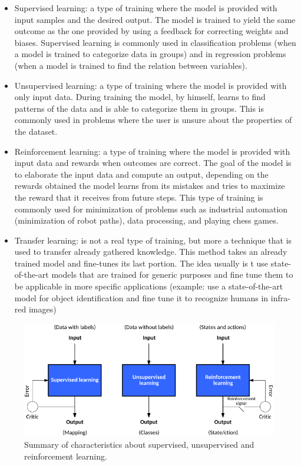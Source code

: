 \documentclass[12pt]{report}
\begin{document}
\begin{itemize}
\item Supervised learning: a type of training where the model is provided with input samples and the desired output. The model is trained to yield the same outcome as the one provided by using a feedback for correcting weights and biases. Supervised learning is commonly used in classification problems (when a model is trained to categorize data in groups) and in regression problems (when a model is trained to find the relation between variables).
\item Unsupervised learning: a type of training where the model is provided with only input data. During training the model, by himself, learns to find patterns of the data and is able to categorize them in groups. This is commonly used in problems where the user is unsure about the properties of the dataset.
\item Reinforcement learning: a type of training where the model is provided with input data and rewards when outcomes are correct. The goal of the model is to elaborate the input data and compute an output, depending on the rewards obtained the model learns from its mistakes and tries to maximize the reward that it receives from future steps. This type of training is commonly used for minimization of problems such as industrial automation (minimization of robot paths), data processing, and playing chess games.
\item Transfer learning: is not a real type of training, but more a technique that is used to transfer already gathered knowledge. This method takes an already trained model and fine-tunes its last portion. The idea usually is t use state-of-the-art models that are trained for generic purposes and fine tune them to be applicable in more specific applications (example: use a state-of-the-art model for object identification and fine tune it to recognize humans in infra-red images)
\end{itemize}

\begin{figure}[h!]
    \centering
    \includegraphics[width=140mm]{Figures/Chapter1/supervised.png} 
    \caption{Summary of characteristics about supervised, unsupervised and reinforcement learning.}
    \label{fig:supervised}    
\end{figure}
\end{document}
